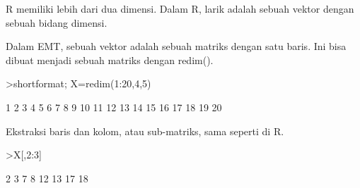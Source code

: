\documentclass[a4paper,10pt]{article}
\begin{document}
\begin{eulernotebook}
\begin{eulercomment}
\begin{eulercomment}
\begin{eulercomment}
\begin{eulercomment}
\begin{eulercomment}
\begin{eulercomment}
\begin{eulercomment}
\begin{eulercomment}
\begin{eulercomment}
\begin{eulercomment}
\begin{eulercomment}
\begin{eulercomment}
\begin{eulercomment}
\begin{eulercomment}
\begin{eulercomment}
\begin{eulercomment}
\begin{eulercomment}
\begin{eulercomment}
\begin{eulercomment}
\begin{eulercomment}
\begin{eulercomment}
\begin{eulercomment}
\begin{eulercomment}
\begin{eulercomment}
\begin{eulercomment}
\begin{eulercomment}
\begin{eulercomment}
\begin{eulercomment}
\begin{eulercomment}
\begin{eulercomment}
\begin{eulercomment}
\begin{eulercomment}
\begin{eulercomment}
\begin{eulercomment}
\begin{eulercomment}
\begin{eulercomment}
\begin{eulercomment}
\begin{eulercomment}
\begin{eulercomment}
\begin{eulercomment}
\begin{eulercomment}
\begin{eulercomment}
\begin{eulercomment}
\begin{eulercomment}
\begin{eulercomment}
\begin{eulercomment}
\begin{eulercomment}
\begin{eulercomment}
\begin{eulercomment}
R memiliki lebih dari dua dimensi. Dalam R, larik adalah sebuah vektor
dengan sebuah bidang dimensi.

Dalam EMT, sebuah vektor adalah sebuah matriks dengan satu baris. Ini
bisa dibuat menjadi sebuah matriks dengan redim().
\end{eulercomment}
\begin{eulerprompt}
>shortformat; X=redim(1:20,4,5)
\end{eulerprompt}
\begin{euleroutput}
          1         2         3         4         5 
          6         7         8         9        10 
         11        12        13        14        15 
         16        17        18        19        20 
\end{euleroutput}
\begin{eulercomment}
Ekstraksi baris dan kolom, atau sub-matriks, sama seperti di R.
\end{eulercomment}
\begin{eulerprompt}
>X[,2:3]
\end{eulerprompt}
\begin{euleroutput}
          2         3 
          7         8 
         12        13 
         17        18 
\end{euleroutput}
\begin{eulercomment}

\end{eulercomment}
\end{eulercomment}
\end{eulercomment}
\end{eulercomment}
\end{eulercomment}
\end{eulercomment}
\end{eulercomment}
\end{eulercomment}
\end{eulercomment}
\end{eulercomment}
\end{eulercomment}
\end{eulercomment}
\end{eulercomment}
\end{eulercomment}
\end{eulercomment}
\end{eulercomment}
\end{eulercomment}
\end{eulercomment}
\end{eulercomment}
\end{eulercomment}
\end{eulercomment}
\end{eulercomment}
\end{eulercomment}
\end{eulercomment}
\end{eulercomment}
\end{eulercomment}
\end{eulercomment}
\end{eulercomment}
\end{eulercomment}
\end{eulercomment}
\end{eulercomment}
\end{eulercomment}
\end{eulercomment}
\end{eulercomment}
\end{eulercomment}
\end{eulercomment}
\end{eulercomment}
\end{eulercomment}
\end{eulercomment}
\end{eulercomment}
\end{eulercomment}
\end{eulercomment}
\end{eulercomment}
\end{eulercomment}
\end{eulercomment}
\end{eulercomment}
\end{eulercomment}
\end{eulercomment}
\end{eulercomment}
\end{eulernotebook}
\end{document}
